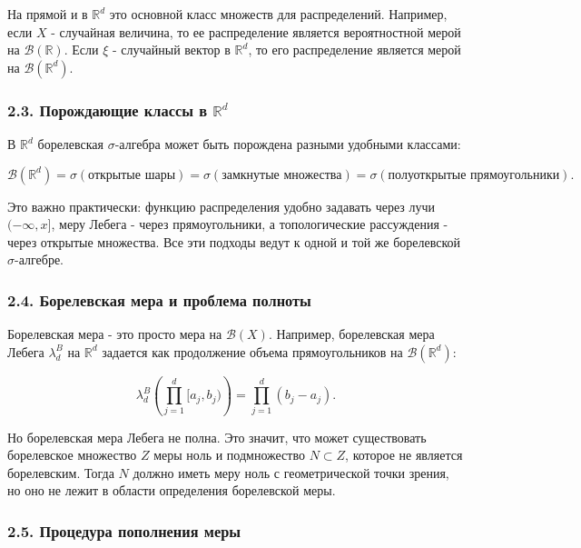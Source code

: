 \documentclass[
  11pt,
  a4paper,
]{article}
\begin{document}
На прямой и в \(\mathbb R^d\) это основной класс множеств для
распределений. Например, если \(X\) - случайная величина, то ее
распределение является вероятностной мерой на \(\mathcal B(\mathbb R)\).
Если \(\xi\) - случайный вектор в \(\mathbb R^d\), то его распределение
является мерой на \(\mathcal B(\mathbb R^d)\).

\subsubsection{\texorpdfstring{2.3. Порождающие классы в
\(\mathbb R^d\)}{2.3. Порождающие классы в \textbackslash mathbb R\^{}d}}\label{ux43fux43eux440ux43eux436ux434ux430ux44eux449ux438ux435-ux43aux43bux430ux441ux441ux44b-ux432-mathbb-rd}

В \(\mathbb R^d\) борелевская \(\sigma\)-алгебра может быть порождена
разными удобными классами:

\[
\mathcal B(\mathbb R^d)
=
\sigma(\text{открытые шары})
=
\sigma(\text{замкнутые множества})
=
\sigma(\text{полуоткрытые прямоугольники}).
\]

Это важно практически: функцию распределения удобно задавать через лучи
\((-\infty,x]\), меру Лебега - через прямоугольники, а топологические
рассуждения - через открытые множества. Все эти подходы ведут к одной и
той же борелевской \(\sigma\)-алгебре.

\subsubsection{2.4. Борелевская мера и проблема
полноты}\label{ux431ux43eux440ux435ux43bux435ux432ux441ux43aux430ux44f-ux43cux435ux440ux430-ux438-ux43fux440ux43eux431ux43bux435ux43cux430-ux43fux43eux43bux43dux43eux442ux44b}

Борелевская мера - это просто мера на \(\mathcal B(X)\). Например,
борелевская мера Лебега \(\lambda_d^B\) на \(\mathbb R^d\) задается как
продолжение объема прямоугольников на \(\mathcal B(\mathbb R^d)\):

\[
\lambda_d^B\left(\prod_{j=1}^d[a_j,b_j)\right)
=
\prod_{j=1}^d(b_j-a_j).
\]

Но борелевская мера Лебега не полна. Это значит, что может существовать
борелевское множество \(Z\) меры ноль и подмножество \(N\subset Z\),
которое не является борелевским. Тогда \(N\) должно иметь меру ноль с
геометрической точки зрения, но оно не лежит в области определения
борелевской меры.

\subsubsection{2.5. Процедура пополнения
меры}\label{ux43fux440ux43eux446ux435ux434ux443ux440ux430-ux43fux43eux43fux43eux43bux43dux435ux43dux438ux44f-ux43cux435ux440ux44b}
\end{document}
